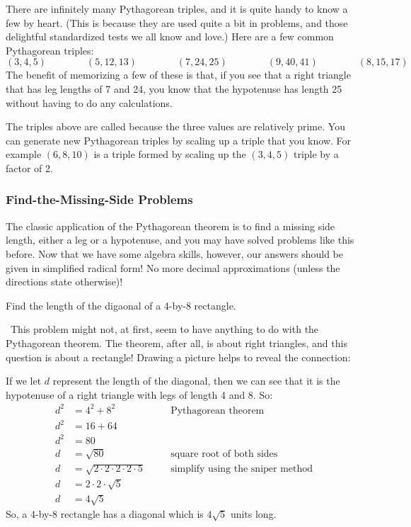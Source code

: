 There are infinitely many Pythagorean triples, and it is quite handy to know a few by heart. (This is because they are used quite a bit in problems, and those delightful standardized tests we all know and love.) Here are a few common Pythagorean triples:
\[
(3, 4, 5) \qquad\qquad
(5, 12, 13) \qquad\qquad
(7, 24, 25) \qquad\qquad
(9, 40, 41) \qquad\qquad
(8, 15, 17)
\]
The benefit of memorizing a few of these is that, if you see that a right triangle that has leg lengths of 7 and 24, you know that the hypotenuse has length 25 without having to do any calculations.

The triples above are called  because the three values are relatively prime. You can generate new Pythagorean triples by scaling up a triple that you know. For example $(6, 8, 10)$ is a triple formed by scaling up the $(3, 4, 5)$ triple by a factor of 2.

\subsubsection{Find-the-Missing-Side Problems}

The classic application of the Pythagorean theorem is to find a missing side length, either a leg or a hypotenuse, and you may have solved problems like this before. Now that we have some algebra skills, however, our answers should be given in simplified radical form! No more decimal approximations (unless the directions state otherwise)!

\begin{boxedex}
Find the length of the digaonal of a 4-by-8 rectangle.

\exsoln\ This problem might not, at first, seem to have anything to do with the Pythagorean theorem. The theorem, after all, is about right triangles, and this question is about a rectangle! Drawing a picture helps to reveal the connection:

\begin{center}\end{center}

If we let $d$ represent the length of the diagonal, then we can see that it is the hypotenuse of a right triangle with legs of length 4 and 8. So:
\begin{align*}
d^2	&= 4^2 + 8^2
&&\quad\text{Pythagorean theorem}\\
d^2&= 16 + 64\\
d^2&= 80\\
d 	&= \sqrt{80}
&&\quad\text{square root of both sides}\\
d 	&= \sqrt{2 \cdot 2 \cdot 2 \cdot 2 \cdot 5}
&&\quad\text{simplify using the sniper method}\\
d 	&= 2 \cdot 2 \cdot \sqrt{5}\\
d 	&= 4\sqrt{5}
\end{align*}
So, a 4-by-8 rectangle has a diagonal which is $4\sqrt5$ units long.
\end{boxedex}


